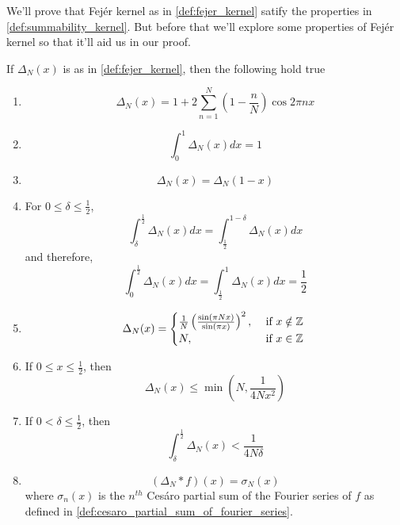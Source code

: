   We'll prove that Fej\'er kernel as in \autoref{def:fejer_kernel} satify the properties in \autoref{def:summability_kernel}. But before that we'll explore some properties of Fej\'er kernel so that it'll aid us in our proof.
  \begin{proposition}
    \label{prop:properties_of_fejer_kernel}
    If $\Delta_N(x)$ is as in \autoref{def:fejer_kernel}, then the following hold true
    \begin{enumerate}[label=(\alph*)]
      \item
        $$\Delta_N(x) = 1 + 2 \sum_{n=1}^{N} ( 1-\frac{n}{N} )\cos{2\pi nx}$$ 
      \item
        $$\int_0^1 \Delta_N(x) dx = 1$$
      \item 
        $$\Delta_N(x) = \Delta_N(1-x)$$
    
\item For $0\le \delta \le \frac{1}{2}$,
        $$\int_\delta^{\frac{1}{2}} \Delta_N(x) dx = \int_{\frac{1}{2}}^{1 - \delta} \Delta_N(x) dx$$
        and therefore,
        $$\int_0^{\frac{1}{2}} \Delta_N(x) dx = \int_{\frac{1}{2}}^{1} \Delta_N(x) dx = \frac{1}{2}$$
      
      \item
        \begin{displaymath}
          \Delta_N(x) = 
            \begin{cases}
              \frac{1}{N}\left( \frac{\sin(\pi Nx)}{\sin(\pi x)} \right)^2, &\text{ if } x\notin \mathbb Z \\
              N, &\text{ if } x \in \mathbb Z\
            \end{cases}
        \end{displaymath}
      \item
        If $0\le x \le \frac{1}{2}$, then $$\Delta_N(x) \le \min\left(N, \frac{1}{4Nx^2}\right)$$
      \item 
        If $0<\delta \le \frac{1}{2}$, then 
        $$\int_\delta^{\frac{1}{2}}\Delta_N(x) < \frac{1}{4N\delta}$$
      \item 
        \begin{displaymath}
          (\Delta_N*f)(x) = \sigma_N(x) 
        \end{displaymath}
        where $\sigma_n(x)$ is the $n^{th}$ Ces\'aro partial sum of the Fourier series of $f$ as defined in \autoref{def:cesaro_partial_sum_of_fourier_series}.
    \end{enumerate}
  \end{proposition}

